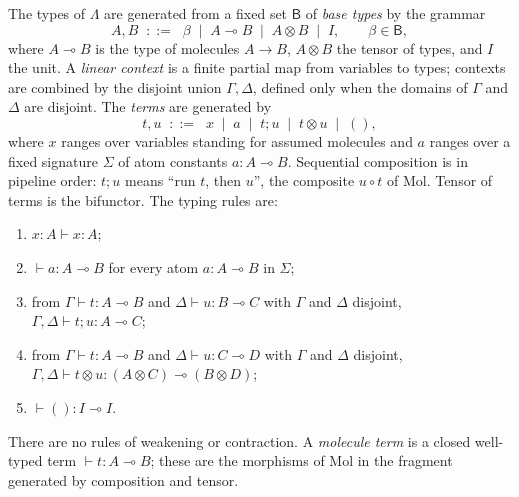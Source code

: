 \begin{definition}\label{def:lambda}
The types of $\Lambda$ are generated from a fixed set $\mathsf{B}$ of \emph{base types} by the grammar
\[
A, B \;\;::=\;\; \beta \;\mid\; A \multimap B \;\mid\; A \otimes B \;\mid\; I,
\qquad \beta \in \mathsf{B},
\]
where $A \multimap B$ is the type of molecules $A \to B$, $A \otimes B$ the tensor of types, and $I$ the unit. A \emph{linear context} is a finite partial map from variables to types; contexts are combined by the disjoint union $\Gamma, \Delta$, defined only when the domains of $\Gamma$ and $\Delta$ are disjoint. The \emph{terms} are generated by
\[
t, u \;\;::=\;\; x \;\mid\; a \;\mid\; t ; u \;\mid\; t \otimes u \;\mid\; (),
\]
where $x$ ranges over variables standing for assumed molecules and $a$ ranges over a fixed signature $\Sigma$ of atom constants $a : A \multimap B$. Sequential composition is in pipeline order: $t ; u$ means ``run $t$, then $u$'', the composite $u \circ t$ of Mol. Tensor of terms is the bifunctor. The typing rules are:
\begin{enumerate}
\item[(var)] $x : A \vdash x : A$;
\item[(atom)] $\vdash a : A \multimap B$ for every atom $a : A \multimap B$ in $\Sigma$;
\item[(comp)] from $\Gamma \vdash t : A \multimap B$ and $\Delta \vdash u : B \multimap C$ with $\Gamma$ and $\Delta$ disjoint, $\Gamma, \Delta \vdash t ; u : A \multimap C$;
\item[(tensor)] from $\Gamma \vdash t : A \multimap B$ and $\Delta \vdash u : C \multimap D$ with $\Gamma$ and $\Delta$ disjoint, $\Gamma, \Delta \vdash t \otimes u : (A \otimes C) \multimap (B \otimes D)$;
\item[(unit)] $\vdash () : I \multimap I$.
\end{enumerate}
There are no rules of weakening or contraction. A \emph{molecule term} is a closed well-typed term $\vdash t : A \multimap B$; these are the morphisms of Mol in the fragment generated by composition and tensor.
\end{definition}

